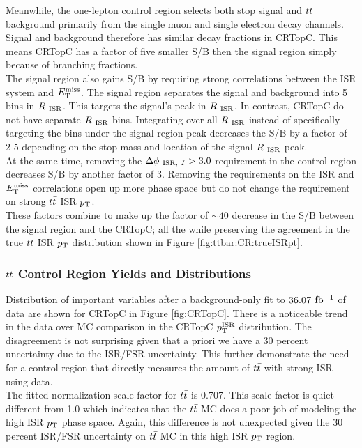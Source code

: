 \indent Meanwhile, the one-lepton control region selects both stop signal and $t\bar{t}$ background primarily from the single muon and single electron decay channels.  Signal and background therefore has similar decay fractions in CRTopC.  This means CRTopC has a factor of five smaller S/B then the signal region simply because of branching fractions.  \\

\indent The signal region also gains S/B by requiring strong correlations between the ISR system and $E_{\mathrm{T}}^{\mathrm{miss}}$.  The signal region separates the signal and background into 5 bins in $R_{~\mathrm{ISR}}$.  This targets the signal's peak in $R_{~\mathrm{ISR}}$.  In contrast, CRTopC do not have separate $R_{~\mathrm{ISR}}$ bins.  Integrating over all $R_{~\mathrm{ISR}}$ instead of specifically targeting the bins under the signal region peak decreases the S/B by a factor of 2-5 depending on the stop mass and location of the signal $R_{~\mathrm{ISR}}$ peak.  \\

\indent At the same time, removing the $\Delta\phi_{~\mathrm{ISR},~I} > 3.0$ requirement in the control region decreases S/B by another factor of 3.  Removing the requirements on the ISR and $E_{\mathrm{T}}^{\mathrm{miss}}$ correlations open up more phase space but do not change the requirement on strong $t\bar{t}$ ISR $p_{\mathrm{T}}$.  \\

\indent These factors combine to make up the factor of $\sim40$ decrease in the S/B between the signal region and the CRTopC; all the while preserving the agreement in the true $t\bar{t}$ ISR $p_{\mathrm{T}}$ distribution shown in Figure \ref{fig:ttbar:CR:trueISRpt}. \\

\subsubsection{$t\bar{t}$ Control Region Yields and Distributions}

\indent Distribution of important variables after a background-only fit to $36.07$ $\mbox{fb$^{-1}$}$ of data are shown for CRTopC in Figure \ref{fig:CRTopC}.   There is a noticeable trend in the data over MC comparison in the CRTopC $p_{\mathrm{T}}^{\mathrm{ISR}}$ distribution.  The disagreement is not surprising given that a priori we have a 30 percent uncertainty due to the ISR/FSR uncertainty.  This further demonstrate the need for a control region that directly measures the amount of $t\bar{t}$ with strong ISR using data. \\

\indent The fitted normalization scale factor for $t\bar{t}$ is 0.707. This scale factor is quiet different from 1.0 which indicates that the $t\bar{t}$ MC does a poor job of modeling the high ISR $p_{\mathrm{T}}$ phase space.  Again, this difference is not unexpected given the 30 percent ISR/FSR uncertainty on $t\bar{t}$ MC in this high ISR $p_{\mathrm{T}}$ region.  \\

